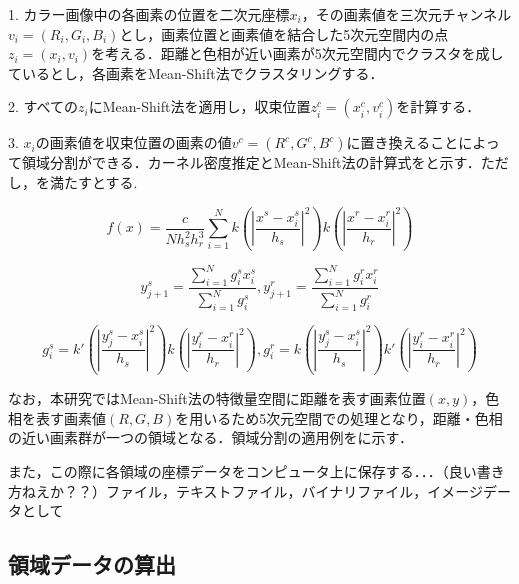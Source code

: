       1. カラー画像中の各画素の位置を二次元座標$x_i$，その画素値を三次元チャンネル$v_{i} =(R_{i},G_{i},B_{i})$とし，画素位置と画素値を結合した5次元空間内の点$z_{i} = (x_{i}, v_{i})$を考える．距離と色相が近い画素が5次元空間内でクラスタを成しているとし，各画素をMean-Shift法でクラスタリングする．

      2. すべての$z_{i}$にMean-Shift法を適用し，収束位置$z_{i}^c = (x_{i}^c , v_{i}^c)$を計算する．
      
      3. $x_{i}$の画素値を収束位置の画素の値$v^c = (R^c, G^c, B^c)$に置き換えることによって領域分割ができる．カーネル密度推定とMean-Shift法の計算式をと示す．ただし，を満たすとする.
    
      \begin{equation}
        \label{Mean-Shift法1}
        f(x) = \dfrac{c} {N h_{s}^2 h_{r}^3}
          \sum_{i=1}^{N}
          k (|\dfrac{x^s - x_{i}^s} {h_{s}}|^2) k (|\dfrac{x^r - x_{i}^r} {h_{r}}|^2)
      \end{equation}

      \begin{equation}
        \label{Mean-Shift法2}
        y_{j+1}^s = 
          \dfrac{\sum_{i=1}^{N} g_{i}^s x_{i}^s} {\sum_{i=1}^{N} g_{i}^s}, 
        y_{j+1}^r = 
          \dfrac{\sum_{i=1}^{N} g_{i}^r x_{i}^r} {\sum_{i=1}^{N} g_{i}^r}
      \end{equation}

      \begin{equation}
        \label{Mean-Shift法3}
        g_{i}^s = k' (|\dfrac{y_{j}^s - x_{i}^s} {h_{s}}|^2)
                  k  (|\dfrac{y_{i}^r - x_{i}^r} {h_{r}}|^2), 
        g_{i}^r = k  (|\dfrac{y_{j}^s - x_{i}^s} {h_{s}}|^2) 
                  k' (|\dfrac{y_{i}^r - x_{i}^r} {h_{r}}|^2)
      \end{equation}

      なお，本研究ではMean-Shift法の特徴量空間に距離を表す画素位置$(x,y)$，色相を表す画素値$(R,G,B)$を用いるため5次元空間での処理となり，距離・色相の近い画素群が一つの領域となる．領域分割の適用例を\fref{}に示す．

      また，この際に各領域の座標データをコンピュータ上に保存する．．．（良い書き方ねえか？？）ファイル，テキストファイル，バイナリファイル，イメージデータとして

    \subsection{領域データの算出}
